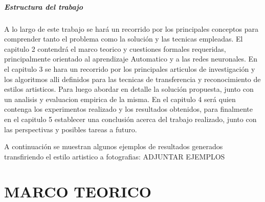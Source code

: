 \documentclass[a4paper,12pt,spanish]{book}
\begin{document}
  \paragraph{Estructura del trabajo}
  A lo largo de este trabajo se hará un recorrido por los principales conceptos para comprender tanto el problema como la solución y las tecnicas empleadas.
  El capitulo 2 contendrá el marco teorico y cuestiones formales requeridas, principalmente orientado al aprendizaje Automatico y a las redes neuronales.
  En el capitulo 3 se hara un recorrido por los principales articulos de investigación y los algoritmos alli definidos para las tecnicas de transferencia y reconocimiento de estilos artisticos.
  Para luego abordar en detalle la solución propuesta, junto con un analisis y evaluacion empirica de la misma.
  En el capitulo 4 será quien contenga los experimentos realizado y los resultados obtenidos, para finalmente en el capitulo 5 establecer una conclusión acerca del trabajo realizado, 
  junto con las perspectivas y posibles tareas a futuro.

A continuación se muestran algunos ejemplos de resultados generados transfiriendo el estilo artistico a fotografias:
ADJUNTAR EJEMPLOS

\iffalse
Tener en cuenta:
In fine art, especially painting, humans have mastered the skill to create unique
visual experiences through composing a complex interplay between the con-
tent and style of an image. Thus far the algorithmic basis of this process is
unknown and there exists no artificial system with similar capabilities. How-
ever, in other key areas of visual perception such as object and face recognition
near-human performance was recently demonstrated by a class of biologically
inspired vision models called Deep Neural Networks. 1, 2 Here we introduce an
artificial system based on a Deep Neural Network that creates artistic images
of high perceptual quality. The system uses neural representations to sepa-
rate and recombine content and style of arbitrary images, providing a neural
algorithm for the creation of artistic images. Moreover, in light of the strik-
ing similarities between performance-optimised artificial neural networks and
biological vision, 3–7 our work offers a path forward to an algorithmic under-
standing of how humans create and perceive artistic imagery.
\fi

\chapter{MARCO TEORICO}
\end{document}

